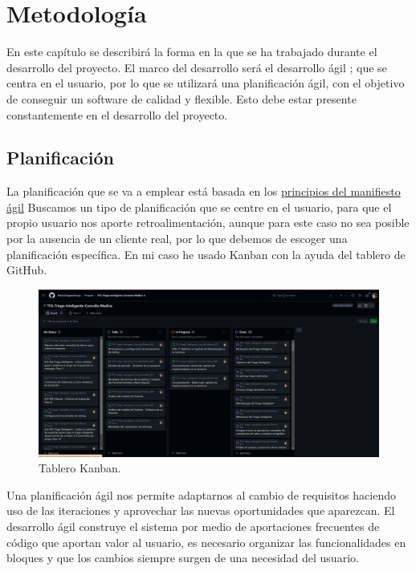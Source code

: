 \UseRawInputEncoding
\chapter{Metodología}
En este capítulo se describirá la forma en la que se ha trabajado durante el desarrollo del proyecto.
El marco del desarrollo será el desarrollo ágil \cite{agile-software-development}; que se centra en el usuario, por lo que se utilizará una planificación ágil, con el objetivo
de conseguir un software de calidad y flexible. Esto debe estar presente constantemente en el desarrollo del proyecto.

\section{Planificación}
La planificación que se va a emplear está basada en los {\href{https://agilemanifesto.org/iso/es/principles.html}{principios del manifiesto ágil}}
Buscamos un tipo de planificación que se centre en el usuario, para que el propio usuario nos aporte retroalimentación, aunque para este caso no sea posible por la
ausencia de un cliente real, por lo que debemos de escoger una planificación específica. En mi caso he usado Kanban con la ayuda del tablero de GitHub.

\begin{figure}[h]
    \centering
    \includegraphics[width=0.9\linewidth]{logos/kanban.png}
    \caption{Tablero Kanban.}
    \label{fig:layout1}
\end{figure}

Una planificación ágil nos permite adaptarnos al cambio de requisitos haciendo uso de las iteraciones y aprovechar las nuevas oportunidades que aparezcan.
El desarrollo ágil construye el sistema por medio de aportaciones frecuentes de código que aportan valor
al usuario, es necesario organizar las funcionalidades en bloques y que los cambios siempre surgen de una necesidad del usuario.

